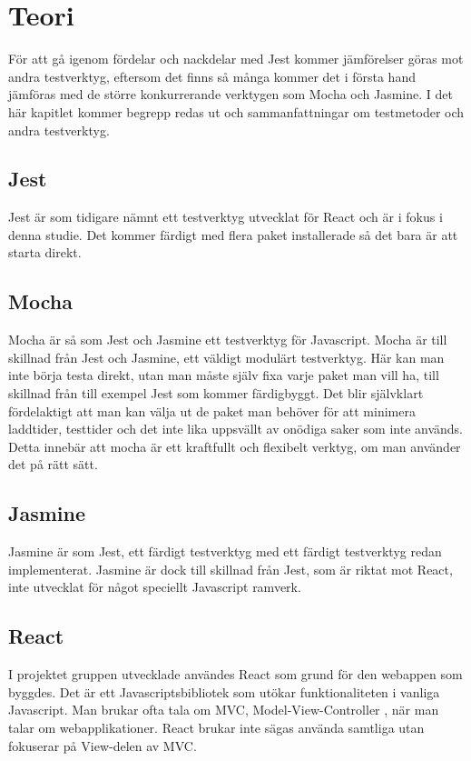 \section{Teori}
\label{sec:david-theory}
För att gå igenom fördelar och nackdelar med Jest kommer jämförelser göras mot andra testverktyg, eftersom det finns så många kommer det i första hand jämföras med de större konkurrerande verktygen\cite{bib-test-tools} som Mocha och Jasmine. I det här kapitlet kommer begrepp redas ut och sammanfattningar om testmetoder och andra testverktyg.

\subsection{Jest}
Jest är som tidigare nämnt ett testverktyg utvecklat för React och är i fokus i denna studie. Det kommer färdigt med flera paket installerade så det bara är att starta direkt. 

\subsection{Mocha}
Mocha är så som Jest och Jasmine ett testverktyg för Javascript. Mocha är till skillnad från Jest och Jasmine, ett väldigt modulärt testverktyg. Här kan man inte börja testa direkt, utan man måste själv fixa varje paket man vill ha, till skillnad från till exempel Jest som kommer färdigbyggt. Det blir självklart fördelaktigt att man kan välja ut de paket man behöver för att minimera laddtider, testtider och det inte lika uppsvällt av onödiga saker som inte används. Detta innebär att mocha är ett kraftfullt och flexibelt verktyg, om man använder det på rätt sätt.

\subsection{Jasmine}
Jasmine är som Jest, ett färdigt testverktyg med ett färdigt testverktyg redan implementerat. Jasmine är dock till skillnad från Jest, som är riktat mot React, inte utvecklat för något speciellt Javascript ramverk.

\subsection{React}
I projektet gruppen utvecklade användes React som grund för den webappen som byggdes. Det är ett Javascriptsbibliotek som utökar funktionaliteten i vanliga Javascript. Man brukar ofta tala om MVC, Model-View-Controller \cite{bib-mvc}, när man talar om webapplikationer. React brukar inte sägas använda samtliga utan fokuserar på View-delen av MVC.


